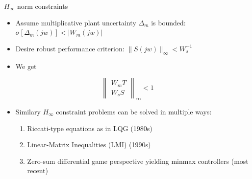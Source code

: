 \documentclass[handout]{beamer}
\begin{document}
\begin{frame}{$H_{\infty}$ norm constraints}
\begin{itemize}
\item Assume multiplicative plant uncertainty $\Delta_m$ is bounded: $\bar{\sigma}[\Delta_m(jw)] < |W_m(jw)|$
\item Desire robust performance criterion: $\|S(jw)\|_{\infty} < W_s^{-1}$
\item We get
\end{itemize}
\begin{equation}
\left\| \begin{array}{c}
W_mT \\
W_sS \end{array} \right\|_{\infty} < 1
\end{equation}
\begin{itemize}
\item Similary $H_{\infty}$ constraint problems can be solved in multiple ways:
\begin{enumerate}
\item Riccati-type equations as in LQG (1980s)
\item Linear-Matrix Inequalities (LMI) (1990s)
\item Zero-sum differential game perspective yielding minmax controllers (most recent)
\end{enumerate}
\end{itemize}
\end{frame}
%
\end{document}
